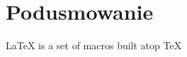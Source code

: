 \documentclass[a4paper,12pt,twoside]{book}
\begin{document}


    \chapter{Podusmowanie}
    

    \LaTeX{} \cite{latex2e} is a set of macros built atop \TeX{} \cite{texbook}

    
    

    \newpage
    \listoffigures

    \newpage
    \listoftables
\end{document}
